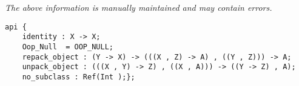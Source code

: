 \label{api:Oop}

{\tiny \it The above information is manually maintained and may contain errors.}
\begin{verbatim}
api {
    identity : X -> X;
    Oop_Null  = OOP_NULL;
    repack_object : (Y -> X) -> (((X , Z) -> A) , ((Y , Z))) -> A;
    unpack_object : (((X , Y) -> Z) , ((X , A))) -> ((Y -> Z) , A);
    no_subclass : Ref(Int );};
\end{verbatim}

